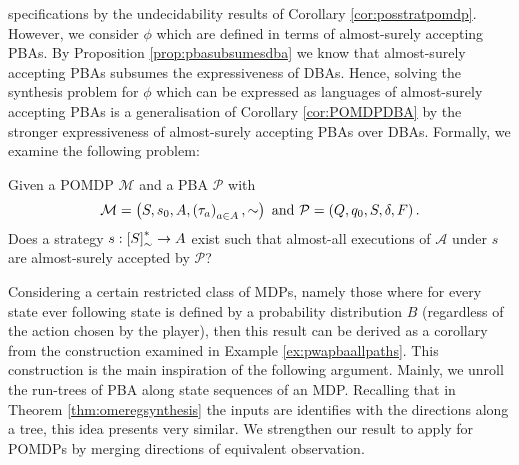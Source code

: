 specifications by the undecidability results of Corollary
\ref{cor:posstratpomdp}. However, we consider $\phi$ which are defined in terms
of almost-surely accepting \acp{PBA}. By Proposition \ref{prop:pbasubsumesdba}
we know that almost-surely accepting \acp{PBA} subsumes the expressiveness of
\acp{DBA}. Hence, solving the synthesis problem for $\phi$ which can be
expressed as languages of almost-surely accepting \acp{PBA} is a generalisation
of Corollary \ref{cor:POMDPDBA} by the stronger expressiveness of almost-surely
accepting \acp{PBA} over \acp{DBA}. Formally, we examine the following
problem:
\begin{definition}
  Given a \ac{POMDP} $\mathcal{M}$ and a \ac{PBA} $\mathcal{P}$ with
  \begin{equation*}
    \mathcal{M} = \left(S, s_{0}, A, \left(\tau_{a}\right)_{a\in A}, \sim\right)
  \text{ and }
    \mathcal{P} = \left(Q, q_{0}, S, \delta, F\right).
  \end{equation*}
  Does a strategy $s:\left[S\right]_{\sim}^{*}\rightarrow A$ exist such that
  almost-all executions of $\mathcal{A}$ under $s$ are almost-surely accepted
  by $\mathcal{P}$?
  \label{def:pbastratsynthesis}
\end{definition}
Considering a certain restricted class of \acp{MDP}, namely those where for
every state ever following state is defined by a probability distribution $B$
(regardless of the action chosen by the player), then this result can be
derived as a corollary from the construction examined in Example
\ref{ex:pwapbaallpaths}. This construction is the main inspiration of the
following argument. Mainly, we unroll the run-trees of \ac{PBA} along state
sequences of an \ac{MDP}. Recalling that in Theorem \ref{thm:omeregsynthesis}
the inputs are identifies with the directions along a tree, this idea presents
very similar. We strengthen our result to apply for \acp{POMDP} by merging
directions of equivalent observation.

